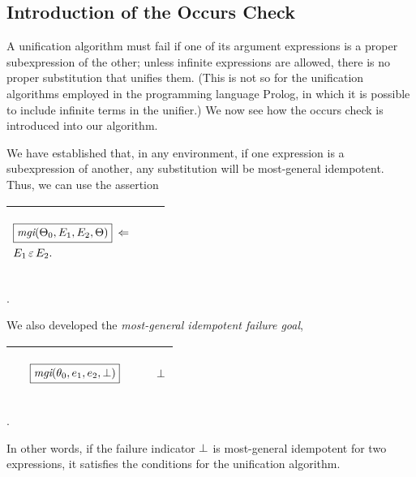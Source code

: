 \documentclass[runningheads]{llncs}
\DeclareMathOperator{\uimpliedby}{\Leftarrow}
\DeclareMathOperator{\mgi}{\emph{mgi}}
\begin{document}
\subsection{Introduction of the Occurs Check}
\label{sec:occurs-check}
A unification algorithm must fail if one of its argument expressions is a proper subexpression of the other; unless infinite expressions are allowed, there is no proper substitution that unifies them.   (This is not so for the unification algorithms employed in the programming language Prolog, in which it is possible to include infinite terms in the unifier.) We now see how the occurs check is introduced into our algorithm.

We have established that, in any environment, if one expression is a subexpression of another, any substitution will be most-general idempotent.  Thus, we can use the assertion 

\begin{center}
\begin{tabular}
{|m{}|m{}||m{}|}
 \hline 
 \begin{center}
 ${\begin{aligned}
 &\boxed{{\mgi}(\Thet{0}, \E{1}, \E{2}, \Theta)} \,\, \uimpliedby \, \\
&\E{1} \occursin \E{2}.
   \end{aligned}}$
   \end{center}
  & 
  &  \\
\hline
\end{tabular}.
\end{center}
We also developed the \emph{most-general idempotent failure goal},
\begin{center}
\begin{tabular}{T}
 \hline 
  & 
  \begin{center}
${\begin{aligned} 
&\begin{aligned}
  \,\, & \boxed{{\mgi}(\thet{0}, \e{1}, \e{2}, \fail)}
\end{aligned}\end{aligned}}$\hspace{1cm} 
\end{center} & \begin{center}$\bot$ \end{center} \\
\hline
\end{tabular}.
\end{center}
In other words, if the failure indicator $\bot$ is most-general idempotent for two expressions, it satisfies the conditions for the unification algorithm.
\end{document}
